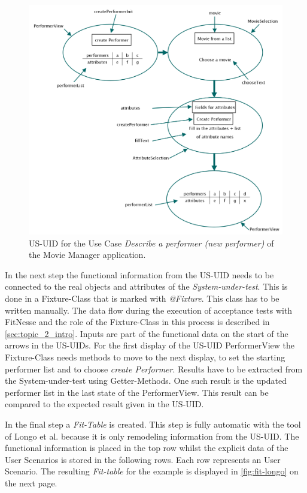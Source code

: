 \begin{figure}[tbh]
	\centering
	\includegraphics[width=.85\textwidth]{../images/US-UID.png}
	\caption{US-UID for the Use Case \textit{Describe a performer (new performer)} of the Movie Manager application.}
	\label{fig:us-uid-mm}
\end{figure}

In the next step the functional information from the US-UID needs to be connected to the real
objects and attributes of the \textit{System-under-test}. This is done in a Fixture-Class that is marked
with \textit{@Fixture}.
This class has to be written manually.
The data flow during the execution of acceptance tests with FitNesse and the role of the Fixture-Class in this process is described in \autoref{sec:topic_2_intro}.
Inputs are part of the functional data on the start of the arrows in the US-UIDs. 
For the first display of the US-UID PerformerView the Fixture-Class needs methods to move to the next display, to set the starting performer list and to choose
\textit{create Performer}.
Results have to be extracted from the System-under-test using Getter-Methods.
One such result is the updated performer list in the last state of the PerformerView.
This result can be compared to the expected result given in the US-UID.

In the final step a \textit{Fit-Table} is created.
This step is fully automatic with the tool of Longo et al. because it is only remodeling information from the US-UID.
The functional information is placed in the top row whilst the explicit data of the User Scenarios is stored in the following rows.
Each row represents an User Scenario.
The resulting \textit{Fit-table} for the example is displayed in \autoref{fig:fit-longo} on the next page.


